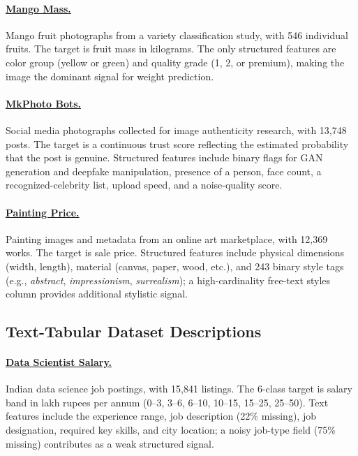\paragraph{\href{https://www.kaggle.com/datasets/saurabhshahane/mango-varieties-classification}{Mango Mass.}} Mango fruit photographs from a variety classification study, with 546 individual fruits.
The target is fruit mass in kilograms.
The only structured features are color group (yellow or green) and quality grade (1, 2, or premium), making the image the dominant signal for weight prediction.

\paragraph{\href{https://www.kaggle.com/datasets/guardeec/mkphoto2023}{MkPhoto Bots.}} Social media photographs collected for image authenticity research, with 13,748 posts.
The target is a continuous trust score reflecting the estimated probability that the post is genuine.
Structured features include binary flags for GAN generation and deepfake manipulation, presence of a person, face count, a recognized-celebrity list, upload speed, and a noise-quality score.

\paragraph{\href{https://www.kaggle.com/datasets/denozavrus/paintings-price-prediction}{Painting Price.}} Painting images and metadata from an online art marketplace, with 12,369 works.
The target is sale price.
Structured features include physical dimensions (width, length), material (canvas, paper, wood, etc.), and 243 binary style tags (e.g., \textit{abstract}, \textit{impressionism}, \textit{surrealism}); a high-cardinality free-text styles column provides additional stylistic signal.


\subsection{Text-Tabular Dataset Descriptions}

\paragraph{\href{https://www.openml.org/search?type=data&id=46664}{Data Scientist Salary.}} Indian data science job postings, with 15,841 listings.
The 6-class target is salary band in lakh rupees per annum (0--3, 3--6, 6--10, 10--15, 15--25, 25--50).
Text features include the experience range, job description (22\% missing), job designation, required key skills, and city location; a noisy job-type field (75\% missing) contributes as a weak structured signal.


